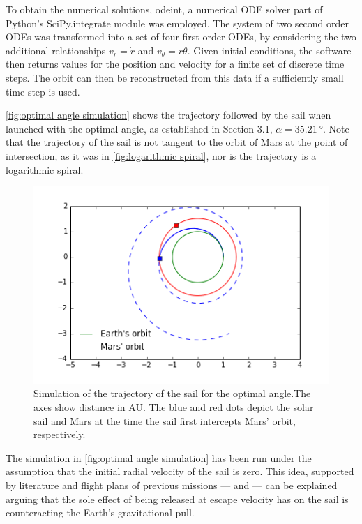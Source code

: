 \documentclass[twocolumn,12pt,a4paper]{article}
\numberwithin{equation}{section}
\begin{document}
To obtain the numerical solutions, odeint, a numerical ODE solver part of Python's SciPy.integrate module was employed. The system of two second order ODEs was transformed into a set of four first order ODEs, by considering the two additional relationships \( v_r = \dot{r} \) and \( v_{\theta} = r \dot{\theta} \). Given initial conditions, the software then returns values for the position and velocity for a finite set of discrete time steps. The orbit can then be reconstructed from this data if a sufficiently small time step is used.

 \autoref{fig:optimal angle simulation} shows the trajectory followed by the sail when launched with the optimal angle, as established in Section 3.1, \( \alpha = \SI{35.21}{\degree} \). Note that the trajectory of the sail is not tangent to the orbit of Mars at the point of intersection, as it was in \autoref{fig:logarithmic spiral}, nor is the trajectory is a logarithmic spiral.

\begin{figure}
	\centering
	\includegraphics[scale=0.5]{simu.png}
	\caption{Simulation of the trajectory of the sail for the optimal angle.The axes show distance in AU. The blue and red dots depict the solar sail and Mars at the time the sail first intercepts Mars' orbit, respectively.}
	\label{fig:optimal angle simulation}
\end{figure}

The simulation in  \autoref{fig:optimal angle simulation} has been run under the assumption that the initial radial velocity of the sail is zero. This idea, supported by literature and flight plans of previous missions ---\cite{tsu} and \cite{xinos}--- can be explained arguing that the sole effect of being released at escape velocity has on the sail is counteracting the Earth's gravitational pull.
\end{document}
